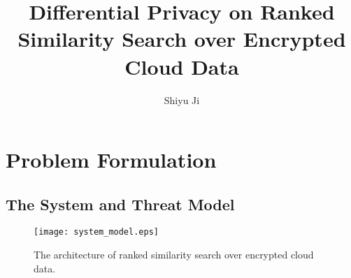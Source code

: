 \documentclass{IEEEtran}
\begin{document}
\title{Differential Privacy on Ranked Similarity Search over Encrypted Cloud Data}
\author{
Shiyu Ji}
\maketitle

\newtheorem{definition}{Definition}
\theoremstyle{definition}
\newtheorem{theorem}{Theorem}
\theoremstyle{plain}
\newtheorem{lemma}{Lemma}
\theoremstyle{plain}
\newtheorem{corollary}{Corollary}
\theoremstyle{plain}

\section{Problem Formulation}
\subsection{The System and Threat Model}
\begin{figure}
\centering
\texttt{[image: system\_model.eps]}
\caption{The architecture of ranked similarity search over encrypted cloud data.}
\label{fig:system_model}
\end{figure}

%
%
\end{document}
